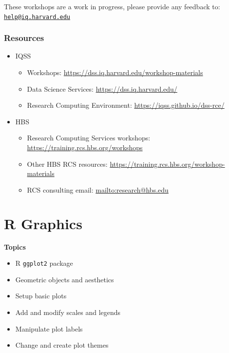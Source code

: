 \documentclass[]{book}
\providecommand{\tightlist}{%
  \setlength{\itemsep}{0pt}\setlength{\parskip}{0pt}}
\begin{document}
These workshops are a work in progress, please provide any feedback to:
\href{mailto:help@iq.harvard.edu}{\nolinkurl{help@iq.harvard.edu}}

\subsection{Resources}\label{resources-3}

\begin{itemize}
\tightlist
\item
  IQSS

  \begin{itemize}
  \tightlist
  \item
    Workshops: \url{https://dss.iq.harvard.edu/workshop-materials}
  \item
    Data Science Services: \url{https://dss.iq.harvard.edu/}
  \item
    Research Computing Environment:
    \url{https://iqss.github.io/dss-rce/}
  \end{itemize}
\item
  HBS

  \begin{itemize}
  \tightlist
  \item
    Research Computing Services workshops:
    \url{https://training.rcs.hbs.org/workshops}
  \item
    Other HBS RCS resources:
    \url{https://training.rcs.hbs.org/workshop-materials}
  \item
    RCS consulting email: \url{mailto:research@hbs.edu}
  \end{itemize}
\end{itemize}

\chapter{R Graphics}\label{r-graphics}

\textbf{Topics}

\begin{itemize}
\tightlist
\item
  R \texttt{ggplot2} package
\item
  Geometric objects and aesthetics
\item
  Setup basic plots
\item
  Add and modify scales and legends
\item
  Manipulate plot labels
\item
  Change and create plot themes
\end{itemize}
\end{document}
